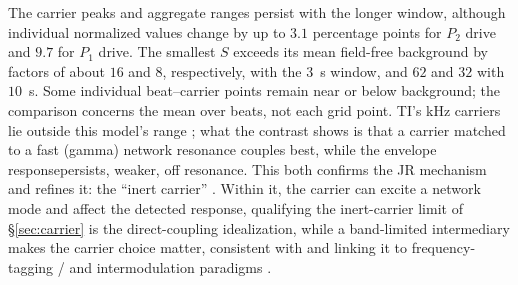 \documentclass[11pt,a4paper]{article}
\providecommand{\DIFaddtex}[1]{{\protect\color{blue} \sf #1}} %
\providecommand{\DIFdeltex}[1]{{\protect\color{red} \scriptsize #1}} %
\providecommand{\DIFaddbegin}{} %
\providecommand{\DIFaddend}{} %
\providecommand{\DIFdelbegin}{} %
\providecommand{\DIFdelend}{} %
\providecommand{\DIFadd}[1]{\texorpdfstring{\DIFaddtex{#1}}{#1}} %
\providecommand{\DIFdel}[1]{\texorpdfstring{\DIFdeltex{#1}}{}} %
\begin{document}
\DIFadd{The carrier peaks and aggregate ranges persist with the longer window, although
individual normalized values change by up to $3.1$ percentage points for $P_2$
drive and $9.7$ for $P_1$ drive. The smallest $S$ exceeds its mean field-free
background by factors of about $16$ and $8$, respectively, with the $3$~s window,
and $62$ and $32$ with $10$~s. Some individual beat--carrier points remain near or below
background; the comparison concerns the mean over beats, not each grid point}\DIFaddend .
TI's kHz carriers lie outside this model's range\DIFdelbegin \DIFdel{; what the contrast shows is that a
carrier matched to a fast (gamma) network resonance couples best, while the envelope
responsepersists, weaker, off resonance. This both confirms the JR mechanism
and refines it: the ``inert carrier'' }\DIFdelend \DIFaddbegin \DIFadd{. Within it, the carrier can
excite a network mode and affect the detected response, qualifying the inert-carrier
limit }\DIFaddend of \S\ref{sec:carrier} \DIFdelbegin \DIFdel{is the
direct-coupling idealization, while a band-limited intermediary makes the carrier
choice matter, consistent with }\DIFdelend \DIFaddbegin \DIFadd{and linking it to }\DIFaddend frequency-tagging \DIFdelbegin \DIFdel{/}\DIFdelend \DIFaddbegin \DIFadd{and
}\DIFaddend intermodulation paradigms \cite{gordon2019}.
\end{document}
